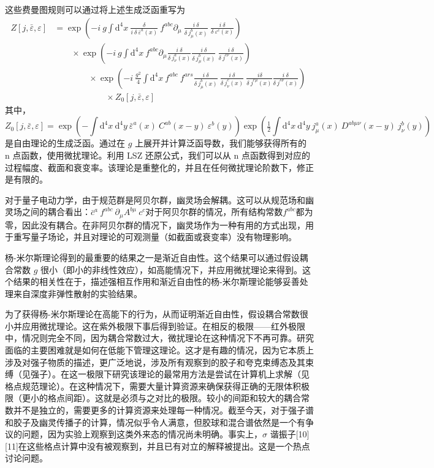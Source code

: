 这些费曼图规则可以通过将上述生成泛函重写为
\[\displaystyle {\begin{aligned}Z[j,{\bar {\varepsilon }},\varepsilon ]&=\exp \left(-i\ g\int \mathrm {d} ^{4}x\ {\frac {\delta }{i\ \delta \ {\bar {\varepsilon }}^{a}(x)}}\ f^{abc}\partial _{\mu }\ {\frac {i\ \delta }{\delta \ j_{\mu }^{b}(x)}}\ {\frac {i\ \delta }{\delta \ \varepsilon ^{c}(x)}}\right)\\&\qquad \times \exp \left(-i\ g\int \mathrm {d} ^{4}x\ f^{abc}\partial _{\mu }{\frac {i\ \delta }{\delta \ j_{\nu }^{a}(x)}}{\frac {i\ \delta }{\delta \ j_{\mu }^{b}(x)}}\ {\frac {i\ \delta }{\delta \ j^{c\nu }(x)}}\right)\\&\qquad \qquad \times \exp \left(-i\ {\frac {g^{2}}{4}}\int \mathrm {d} ^{4}x\ f^{abc}\ f^{ars}{\frac {i\ \delta }{\delta \ j_{\mu }^{b}(x)}}\ {\frac {i\ \delta }{\delta \ j_{\nu }^{c}(x)}}\ {\frac {\ i\delta }{\delta \ j^{r\mu }(x)}}{\frac {i\ \delta }{\delta \ j^{s\nu }(x)}}\right)\\&\qquad \qquad \qquad \times Z_{0}[j,{\bar {\varepsilon }},\varepsilon ]\end{aligned}}~\]
其中，
\[\displaystyle Z_{0}[j,{\bar {\varepsilon }},\varepsilon ]=\exp \left(-\int \mathrm {d} ^{4}x\ \mathrm {d} ^{4}y\ {\bar {\varepsilon }}^{a}(x)\ C^{ab}(x-y)\ \varepsilon ^{b}(y)\right)\exp \left({\tfrac {1}{2}}\int \mathrm {d} ^{4}x\ \mathrm {d} ^{4}y\ j_{\mu }^{a}(x)\ D^{ab\mu \nu }(x-y)\ j_{\nu }^{b}(y)\right)~\]
是自由理论的生成泛函。通过在 \(g\) 上展开并计算泛函导数，我们能够获得所有的 n 点函数，使用微扰理论。利用 LSZ 还原公式，我们可以从 n 点函数得到对应的过程幅度、截面和衰变率。该理论是重整化的，并且在任何微扰理论阶数下，修正是有限的。

对于量子电动力学，由于规范群是阿贝尔群，幽灵场会解耦。这可以从规范场和幽灵场之间的耦合看出：\(\displaystyle {\bar {c}}^{a}\ f^{abc}\ \partial _{\mu }A^{b\mu }\ c^{c}\)对于阿贝尔群的情况，所有结构常数\(\displaystyle f^{abc}\)都为零，因此没有耦合。在非阿贝尔群的情况下，幽灵场作为一种有用的方式出现，用于重写量子场论，并且对理论的可观测量（如截面或衰变率）没有物理影响。

杨-米尔斯理论得到的最重要的结果之一是渐近自由性。这个结果可以通过假设耦合常数 \(g\) 很小（即小的非线性效应），如高能情况下，并应用微扰理论来得到。这个结果的相关性在于，描述强相互作用和渐近自由性的杨-米尔斯理论能够妥善处理来自深度非弹性散射的实验结果。

为了获得杨-米尔斯理论在高能下的行为，从而证明渐近自由性，假设耦合常数很小并应用微扰理论。这在紫外极限下事后得到验证。在相反的极限——红外极限中，情况则完全不同，因为耦合常数过大，微扰理论在这种情况下不再可靠。研究面临的主要困难就是如何在低能下管理这理论。这才是有趣的情况，因为它本质上涉及对强子物质的描述，更广泛地说，涉及所有观察到的胶子和夸克束缚态及其束缚（见强子）。在这一极限下研究该理论的最常用方法是尝试在计算机上求解（见格点规范理论）。在这种情况下，需要大量计算资源来确保获得正确的无限体积极限（更小的格点间距）。这就是必须与之对比的极限。较小的间距和较大的耦合常数并不是独立的，需要更多的计算资源来处理每一种情况。截至今天，对于强子谱和胶子及幽灵传播子的计算，情况似乎令人满意，但胶球和混合谱依然是一个有争议的问题，因为实验上观察到这类外来态的情况尚未明确。事实上，\(\sigma\) 谐振子[10][11]在这些格点计算中没有被观察到，并且已有对立的解释被提出。这是一个热点讨论问题。